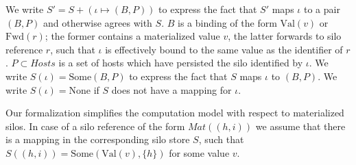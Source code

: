 \documentclass{article}
\theoremstyle{definition}
\newcommand{\Val}[1]{\text{Val}(#1)}
\newcommand{\Fwd}[1]{\text{Fwd}(#1)}
\begin{document}
\newpage

%
%


We write $S' = S + (\iota \mapsto (B, P))$ to express the fact that $S'$ maps $\iota$ to a pair $(B, P)$ and otherwise agrees with $S$. $B$ is a binding of the form $\Val{v}$ or $\Fwd{r}$; the former contains a materialized value $v$, the latter forwards to silo reference $r$, such that $\iota$ is effectively bound to the same value as the identifier of $r$. $P \subset Hosts$ is a set of hosts which have persisted the silo identified by $\iota$. We write $S(\iota) = \text{Some}(B, P)$ to express the fact that $S$ maps $\iota$ to $(B, P)$. We write $S(\iota) = \text{None}$ if $S$ does not have a mapping for $\iota$.

Our formalization simplifies the computation model with respect to materialized silos. In case of a silo reference of the form $Mat((h, i))$ we assume that there is a mapping in the corresponding silo store $S$, such that $S((h, i)) = \text{Some}(\Val{v}, \{ h \})$ for some value $v$.

\end{document}
